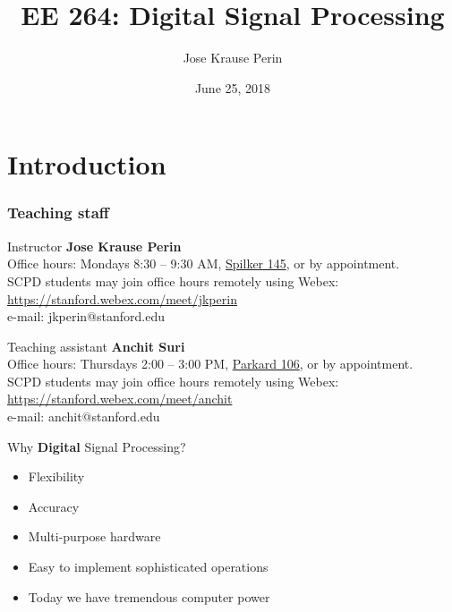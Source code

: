 \documentclass[10pt, aspectratio=169]{beamer}
\title[EE 264]{EE 264: Digital Signal Processing}
\author{Jose Krause Perin}
\institute{Stanford University}
\date{June 25, 2018}
\begin{document}
\begin{frame}
  \titlepage
\end{frame}

\section{Introduction}

\begin{frame}
\frametitle{Teaching staff}

\begin{block}{Instructor}
	\textbf{Jose Krause Perin} \\
	Office hours: Mondays 8:30 -- 9:30 AM, \href{https://campus-map.stanford.edu/?id=04-040&lat=37.42879024&lng=-122.1740029&zoom=17&srch=spilker}{Spilker 145}, or by appointment. \\
	SCPD students may join office hours remotely using Webex: \href{ https://stanford.webex.com/stanford-en/j.php?MTID=m07046ca0da0ed2a46b9a203fa6707fb4}{https://stanford.webex.com/meet/jkperin} \\
	e-mail: jkperin@stanford.edu
\end{block}

\begin{block}{Teaching assistant}
	\textbf{Anchit Suri} \\
	Office hours: Thursdays 2:00 -- 3:00 PM, \href{https://campus-map.stanford.edu/?id=04-030&lat=37.42924401&lng=-122.17383732&zoom=17&srch=packard}{Parkard 106}, or by appointment. \\
	SCPD students may join office hours remotely using Webex: \href{https://stanford.webex.com/meet/anchit}{https://stanford.webex.com/meet/anchit} \\
	e-mail: anchit@stanford.edu
\end{block}
   	
\end{frame}

%
\begin{frame}{Why {\bf Digital} Signal Processing?}

\begin{itemize}
  \item Flexibility
  \item Accuracy
  \item Multi-purpose hardware
  \item Easy to implement sophisticated operations
  \item Today we have tremendous computer power
\end{itemize}

\end{frame}
\end{document}
